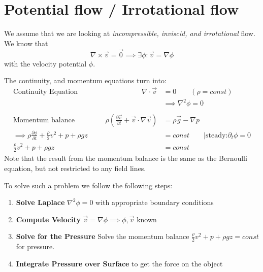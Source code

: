 \section{Potential flow / Irrotational flow}
We assume that we are looking at \textit{incompressible, inviscid, and irrotational} flow.
We know that
\begin{equation*}
	\nabla \times \vec v = \vec 0\implies \exists \phi : \vec v = \nabla \phi
\end{equation*}
with the velocity potential $\phi$.

The continuity, and momentum equations turn into:
\begin{equation*}
	\begin{split}
		\text{Continuity Equation}\qquad\qquad\qquad\qquad\quad \nabla \cdot \vec v &= 0 \qquad (\rho = const) \\
		&\implies \boxed{\nabla^2 \phi = 0}\\\\
		\text{Momentum balance}\qquad\,\,\qquad \rho \left(\frac{\partial \vec v}{\partial t}+ \vec v \cdot \nabla \vec v \right) &= \rho \vec g - \nabla p \qquad \\
		\implies  \rho \frac{\partial \phi}{\partial t} + \frac{\rho}{2}v^2 + p + \rho g z &= const \qquad \Big | \text{steady:} \partial_t \phi = 0\\		
		\frac{\rho}{2}v^2 + p + \rho g z &= const
	\end{split}
\end{equation*}
Note that the result from the momentum balance is the same as the Bernoulli equation, but not restricted to any field lines.

To solve such a problem we follow the following steps:
\begin{enumerate}
	\setlength{\itemsep}{-5pt}
	\item \textbf{Solve Laplace} $\nabla^2\phi = 0$ with appropriate boundary conditions
	\item \textbf{Compute Velocity} $\vec v = \nabla \phi\implies \phi, \vec v$ known
	\item \textbf{Solve for the Pressure} Solve the momentum balance $\frac{\rho}{2}v^2 + p + \rho g z = const$ for pressure.
	\item \textbf{Integrate Pressure over Surface} to get the force on the object
\end{enumerate}


